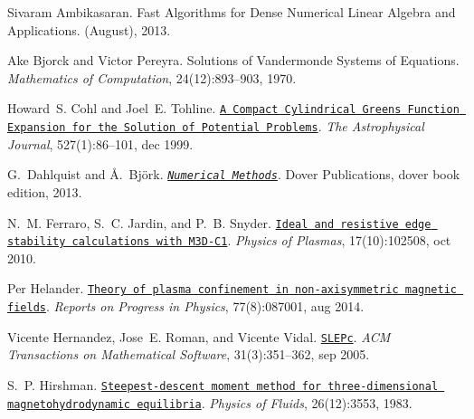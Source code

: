 
\begin{DoxyDescription}
\item[\label{_CITEREF_Ambikasaran2013}%
\mbox{[}1\mbox{]}]Sivaram Ambikasaran. Fast Algorithms for Dense Numerical Linear Algebra and Applications. (August), 2013.


\item[\label{_CITEREF_Bjorck1970}%
\mbox{[}2\mbox{]}]Ake Bjorck and Victor Pereyra. Solutions of Vandermonde Systems of Equations. {\itshape Mathematics of Computation}, 24(12)\+:893--903, 1970.


\item[\label{_CITEREF_Cohl1999}%
\mbox{[}3\mbox{]}]Howard~S. Cohl and Joel~E. Tohline. \href{http://stacks.iop.org/0004-637X/527/i=1/a=86}{\tt A Compact Cylindrical Green\textquotesingle{}s Function Expansion for the Solution of Potential Problems}. {\itshape The Astrophysical Journal}, 527(1)\+:86--101, dec 1999. 


\item[\label{_CITEREF_dahlquist2003numerical}%
\mbox{[}4\mbox{]}]G.~Dahlquist and \AA.~Bj\"{o}rk. \href{http://books.google.es/books?id=armfeHpJIwAC}{\tt {\itshape Numerical Methods}}. Dover Publications, dover book edition, 2013.


\item[\label{_CITEREF_ferraro2010ELMbenchmark}%
\mbox{[}5\mbox{]}]N.~M. Ferraro, S.~C. Jardin, and P.~B. Snyder. \href{http://aip.scitation.org/doi/10.1063/1.3492727}{\tt Ideal and resistive edge stability calculations with M3\+D-\/\+C1}. {\itshape Physics of Plasmas}, 17(10)\+:102508, oct 2010. 


\item[\label{_CITEREF_Helander2014}%
\mbox{[}6\mbox{]}]Per Helander. \href{http://stacks.iop.org/0034-4885/77/i=8/a=087001?key=crossref.bf6909cc443072b7619599e69fafa0da}{\tt Theory of plasma confinement in non-\/axisymmetric magnetic fields}. {\itshape Reports on Progress in Physics}, 77(8)\+:087001, aug 2014. 


\item[\label{_CITEREF_Hernandez2005slepc}%
\mbox{[}7\mbox{]}]Vicente Hernandez, Jose~E. Roman, and Vicente Vidal. \href{http://portal.acm.org/citation.cfm?doid=1089014.1089019}{\tt S\+L\+E\+Pc}. {\itshape A\+CM Transactions on Mathematical Software}, 31(3)\+:351--362, sep 2005. 


\item[\label{_CITEREF_hirshman1983vmec}%
\mbox{[}8\mbox{]}]S.~P. Hirshman. \href{http://scitation.aip.org/content/aip/journal/pof1/26/12/10.1063/1.864116}{\tt Steepest-\/descent moment method for three-\/dimensional magnetohydrodynamic equilibria}. {\itshape Physics of Fluids}, 26(12)\+:3553, 1983. 



\end{DoxyDescription}

